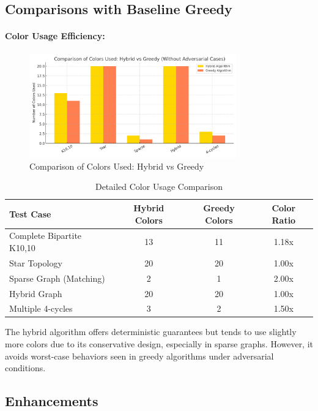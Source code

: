 \documentclass[11pt]{article}
\begin{document}
\subsection{Comparisons with Baseline Greedy}

\paragraph{Color Usage Efficiency:}

\begin{figure}[H]
    \centering
    \includegraphics[width=0.8\textwidth]{colors_comparison.png}
    \caption{Comparison of Colors Used: Hybrid vs Greedy}
\end{figure}

\begin{table}[H]
\centering
\caption{Detailed Color Usage Comparison}
\begin{tabular}{|l|c|c|c|}
\hline
\textbf{Test Case} & \textbf{Hybrid Colors} & \textbf{Greedy Colors} & \textbf{Color Ratio} \\
\hline
Complete Bipartite K10,10     & 13  & 11  & 1.18x \\
Star Topology                 & 20  & 20  & 1.00x \\
Sparse Graph (Matching)       & 2   & 1   & 2.00x \\
Hybrid Graph                  & 20  & 20  & 1.00x \\
Multiple 4-cycles             & 3   & 2   & 1.50x \\
\hline
\end{tabular}
\end{table}

The hybrid algorithm offers deterministic guarantees but tends to use slightly more colors due to its conservative design, especially in sparse graphs. However, it avoids worst-case behaviors seen in greedy algorithms under adversarial conditions.

\subsection{Enhancements}
\end{document}
